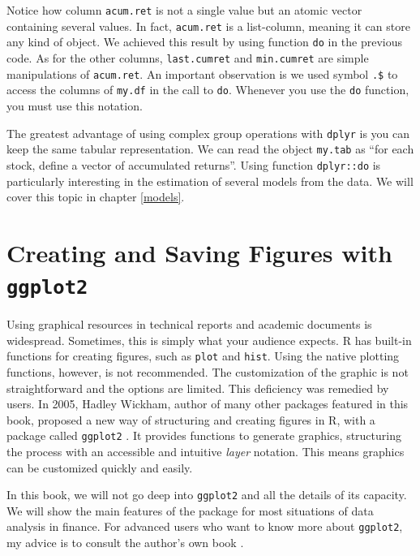 \documentclass[11pt,]{book}
\begin{document}
Notice how column \texttt{acum.ret} is not a single value but an atomic
vector containing several values. In fact, \texttt{acum.ret} is a
list-column, meaning it can store any kind of object. We achieved this
result by using function \texttt{do} in the previous code. As for the
other columns, \texttt{last.cumret} and \texttt{min.cumret} are simple
manipulations of \texttt{acum.ret}. An important observation is we used
symbol \texttt{.\$} to access the columns of \texttt{my.df} in the call
to \texttt{do}. Whenever you use the \texttt{do} function, you must use
this notation.

The greatest advantage of using complex group operations with
\texttt{dplyr} is you can keep the same tabular representation. We can
read the object \texttt{my.tab} as ``for each stock, define a vector of
accumulated returns''. Using function \texttt{dplyr::do} is particularly
interesting in the estimation of several models from the data. We will
cover this topic in chapter \ref{models}.

\chapter{\texorpdfstring{Creating and Saving Figures with
\texttt{ggplot2}}{Creating and Saving Figures with ggplot2}}\label{Figures}

Using graphical resources in technical reports and academic documents is
widespread. Sometimes, this is simply what your audience expects. R has
built-in functions for creating figures, such as \texttt{plot} and
\texttt{hist}. Using the native plotting functions, however, is not
recommended. The customization of the graphic is not straightforward and
the options are limited. This deficiency was remedied by users. In 2005,
Hadley Wickham, author of many other packages featured in this book,
proposed a new way of structuring and creating figures in R, with a
package called \texttt{ggplot2} \citep{wickham2009ggplot2}. It provides
functions to generate graphics, structuring the process with an
accessible and intuitive \emph{layer} notation. This means graphics can
be customized quickly and easily. 

In this book, we will not go deep into \texttt{ggplot2} and all the
details of its capacity. We will show the main features of the package
for most situations of data analysis in finance. For advanced users who
want to know more about \texttt{ggplot2}, my advice is to consult the
author's own book \citep{wickham2009ggplot2}.
\end{document}
